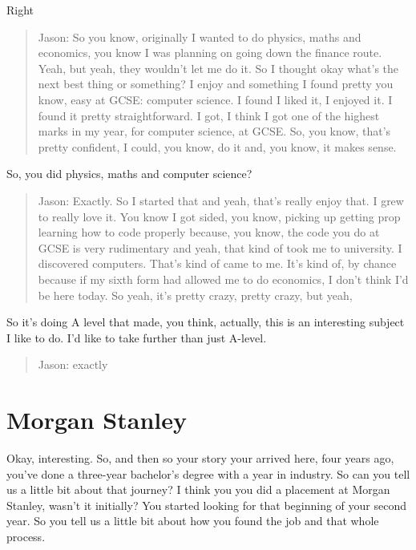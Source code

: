 \documentclass[
]{book}
\begin{document}
Right

\begin{quote}
Jason: So you know, originally I wanted to do physics, maths and economics, you know I was planning on going down the finance route. Yeah, but yeah, they wouldn't let me do it. So I thought okay what's the next best thing or something? I enjoy and something I found pretty you know, easy at GCSE: computer science. I found I liked it, I enjoyed it. I found it pretty straightforward. I got, I think I got one of the highest marks in my year, for computer science, at GCSE. So, you know, that's pretty confident, I could, you know, do it and, you know, it makes sense.
\end{quote}

So, you did physics, maths and computer science?

\begin{quote}
Jason: Exactly. So I started that and yeah, that's really enjoy that. I grew to really love it. You know I got sided, you know, picking up getting prop learning how to code properly because, you know, the code you do at GCSE is very rudimentary and yeah, that kind of took me to university. I discovered computers. That's kind of came to me. It's kind of, by chance because if my sixth form had allowed me to do economics, I don't think I'd be here today. So yeah, it's pretty crazy, pretty crazy, but yeah,
\end{quote}

So it's doing A level that made, you think, actually, this is an interesting subject I like to do. I'd like to take further than just A-level.

\begin{quote}
Jason: exactly
\end{quote}

\hypertarget{jstanley}{%
\section{Morgan Stanley}\label{jstanley}}

Okay, interesting. So, and then so your story your arrived here, four years ago, you've done a three-year bachelor's degree with a year in industry. So can you tell us a little bit about that journey? I think you you did a placement at Morgan Stanley, wasn't it initially? You started looking for that beginning of your second year. So you tell us a little bit about how you found the job and that whole process.
\end{document}
